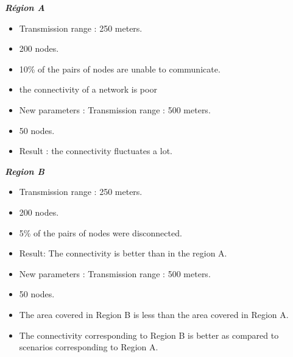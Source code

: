 \begin{multicols}{2}
\textit{\textbf{Région A}}
\begin{itemize}
\item Transmission range : 250 meters.
\item 200 nodes.
\item 10\% of the pairs of nodes are unable to communicate.
\item the connectivity of a network is poor
\item New parameters : Transmission range : 500 meters.
\item 50 nodes.
\item Result : the connectivity fluctuates a lot.
\end{itemize}
\columnbreak
\textit{\textbf{Region B}}
\begin{itemize}
\item Transmission range : 250 meters.
\item 200 nodes.
\item 5\% of the pairs of nodes were disconnected.
\item Result: The connectivity is better than in the region A.
\item New parameters : Transmission range : 500 meters.
\item 50 nodes.
\item The area covered in Region B is less than the area covered in Region A.
\item The connectivity corresponding to Region B is better as compared to scenarios corresponding to Region A.
\end{itemize}
\end{multicols}



